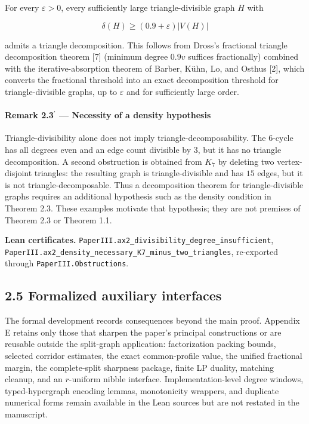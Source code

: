 \documentclass[
  american,
  11pt,
  a4paper,
]{article}
\begin{document}
For every \(\varepsilon>0\), every sufficiently large triangle-divisible graph \(H\) with

\[
\delta(H)\ge(0.9+\varepsilon)|V(H)|
\]

admits a triangle decomposition. This follows from Dross's fractional triangle decomposition theorem {[}7{]} (minimum degree \(0.9v\) suffices fractionally) combined with the iterative-absorption theorem of Barber, Kühn, Lo, and Osthus {[}2{]}, which converts the fractional threshold into an exact decomposition threshold for triangle-divisible graphs, up to \(\varepsilon\) and for sufficiently large order.

\paragraph{\texorpdfstring{Remark 2.3\(^{\prime}\) --- Necessity of a density hypothesis}{Remark 2.3\^{}\{\textbackslash prime\} --- Necessity of a density hypothesis}}\label{remark-2.3prime-necessity-of-a-density-hypothesis}

Triangle-divisibility alone does not imply triangle-decomposability. The 6-cycle has all degrees even and an edge count divisible by \(3\), but it has no triangle decomposition. A second obstruction is obtained from \(K_7\) by deleting two vertex-disjoint triangles: the resulting graph is triangle-divisible and has \(15\) edges, but it is not triangle-decomposable. Thus a decomposition theorem for triangle-divisible graphs requires an additional hypothesis such as the density condition in Theorem 2.3. These examples motivate that hypothesis; they are not premises of Theorem 2.3 or Theorem 1.1.

\textbf{Lean certificates.} \texttt{PaperIII.ax2\_divisibility\_degree\_insufficient}, \texttt{PaperIII.ax2\_density\_necessary\_K7\_minus\_two\_triangles}, re-exported through \texttt{PaperIII.Obstructions}.

\subsection{2.5 Formalized auxiliary interfaces}\label{formalized-auxiliary-interfaces}

The formal development records consequences beyond the main proof. Appendix E retains only those that sharpen the paper's principal constructions or are reusable outside the split-graph application: factorization packing bounds, selected corridor estimates, the exact common-profile value, the unified fractional margin, the complete-split sharpness package, finite LP duality, matching cleanup, and an \(r\)-uniform nibble interface. Implementation-level degree windows, typed-hypergraph encoding lemmas, monotonicity wrappers, and duplicate numerical forms remain available in the Lean sources but are not restated in the manuscript.
\end{document}
